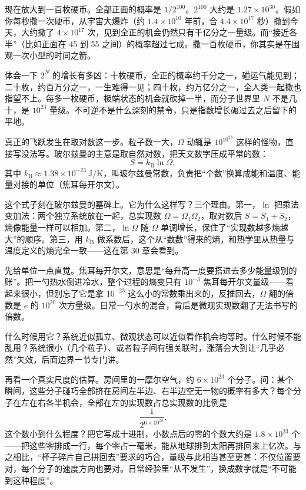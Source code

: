 现在放大到一百枚硬币。全部正面的概率是 \(1/2^{100}\)。\(2^{100}\) 大约是 \(1.27\times10^{30}\)。假如你每秒撒一次硬币，从宇宙大爆炸（约 \(1.4\times10^{10}\) 年前，合 \(4.4\times10^{17}\) 秒）撒到今天，大约撒了 \(4\times10^{17}\) 次，见到全正的机会仍然只有千亿分之一量级。而“接近各半”（比如正面在 45 到 55 之间）的概率超过七成。撒一百枚硬币，你其实是在围观一次小型的时间之箭。

体会一下 \(2^N\) 的增长有多凶：十枚硬币，全正的概率约千分之一，碰运气能见到；二十枚，约百万分之一，一生难得一见；四十枚，约万亿分之一，全人类一起撒也指望不上。每多一枚硬币，极端状态的机会就砍掉一半，而分子世界里 \(N\) 不是几十，是 \(10^{23}\) 量级。不可逆不是什么深刻的禁令，只是指数增长碾过去之后留下的平地。

\begin{mathbridge}
真正的飞跃发生在取对数这一步。粒子数一大，\(\Omega\) 动辄是 \(10^{10^{23}}\) 这样的怪物，直接写没法写。玻尔兹曼的主意是取自然对数，把天文数字压成平常的数：
\[
S = k_{\mathrm{B}} \ln \Omega,
\]
其中 \(k_{\mathrm{B}}\approx1.38\times10^{-23}\ \mathrm{J/K}\)，叫玻尔兹曼常数，负责把“个数”换算成能和温度、能量对接的单位（焦耳每开尔文）。

这个式子刻在玻尔兹曼的墓碑上。它为什么这样写？三个理由。第一，\(\ln\) 把乘法变加法：两个独立系统放在一起，总实现数 \(\Omega=\Omega_1\Omega_2\)，取对数后 \(S=S_1+S_2\)，熵像能量一样可以相加。第二，\(\ln\Omega\) 随 \(\Omega\) 单调增长，保住了“实现数越多熵越大”的顺序。第三，用 \(k_{\mathrm{B}}\) 做系数后，这个从“数数”得来的熵，和热学里从热量与温度定义的熵完全一致——这在第 30 章会看到。

先给单位一点直觉。焦耳每开尔文，意思是“每升高一度要搭进去多少能量级别的账”。把一勺热水倒进冷水，整个过程的熵变只有 \(10^{-3}\) 焦耳每开尔文量级——看起来很小，但别忘了它是拿 \(10^{-23}\) 这么小的常数乘出来的，反推回去，\(\Omega\) 翻的倍数是 \(e\) 的 \(10^{20}\) 次方量级。日常一勺水的混合，背后是微观实现数翻了无法书写的倍数。

什么时候用它？系统近似孤立、微观状态可以近似看作机会均等时。什么时候不能乱用？系统很小（几个粒子）、或者粒子间有强关联时，涨落会大到让“几乎必然”失效，后面边界一节专门讲。
\end{mathbridge}

再看一个真实尺度的估算。房间里的一摩尔空气，约 \(6\times10^{23}\) 个分子。问：某个瞬间，这些分子碰巧全部挤在房间左半边、右半边空无一物的概率有多大？每个分子在左在右各半机会，全部在左的实现数占总实现数的比例是
\[
\frac{1}{2^{6\times10^{23}}}.
\]
这个数小到什么程度？把它写成十进制，小数点后的零的个数大约是 \(1.8\times10^{23}\) 个——把这些零排成一行，每个零占一毫米，能从地球排到太阳再排回来上亿次。与之相比，“杯子碎片自己拼回去”要求的巧合，量级与此相当甚至更甚：不仅位置要对，每个分子的速度方向也要对。日常经验里“从不发生”，换成数字就是“不可能到这种程度”。

